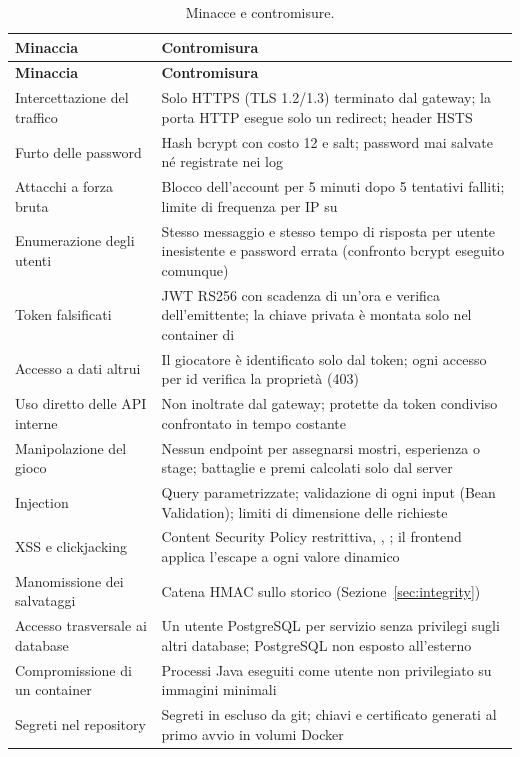 \documentclass[11pt,a4paper]{report}
\begin{document}
\begin{xltabular}{\linewidth}{@{}P{3.6cm}L@{}}
\caption{Minacce e contromisure.}\label{tab:sec}\\
\toprule
\textbf{Minaccia} & \textbf{Contromisura} \\
\midrule
\endfirsthead
\toprule
\textbf{Minaccia} & \textbf{Contromisura} \\
\midrule
\endhead
\bottomrule
\endfoot
Intercettazione del traffico & Solo HTTPS (TLS 1.2/1.3) terminato dal gateway; la porta HTTP esegue solo un redirect; header HSTS \\
Furto delle password & Hash bcrypt con costo 12 e salt; password mai salvate né registrate nei log \\
Attacchi a forza bruta & Blocco dell'account per 5 minuti dopo 5 tentativi falliti; limite di frequenza per IP su  \\
Enumerazione degli utenti & Stesso messaggio e stesso tempo di risposta per utente inesistente e password errata (confronto bcrypt eseguito comunque) \\
Token falsificati & JWT RS256 con scadenza di un'ora e verifica dell'emittente; la chiave privata è montata solo nel container di  \\
Accesso a dati altrui & Il giocatore è identificato solo dal token; ogni accesso per id verifica la proprietà (403) \\
Uso diretto delle API interne & Non inoltrate dal gateway; protette da token condiviso confrontato in tempo costante \\
Manipolazione del gioco & Nessun endpoint per assegnarsi mostri, esperienza o stage; battaglie e premi calcolati solo dal server \\
Injection & Query parametrizzate; validazione di ogni input (Bean Validation); limiti di dimensione delle richieste \\
XSS e clickjacking & Content Security Policy restrittiva, , ; il frontend applica l'escape a ogni valore dinamico \\
Manomissione dei salvataggi & Catena HMAC sullo storico (Sezione~\ref{sec:integrity}) \\
Accesso trasversale ai database & Un utente PostgreSQL per servizio senza privilegi sugli altri database; PostgreSQL non esposto all'esterno \\
Compromissione di un container & Processi Java eseguiti come utente non privilegiato su immagini minimali \\
Segreti nel repository & Segreti in  escluso da git; chiavi e certificato generati al primo avvio in volumi Docker \\
\end{xltabular}
\end{document}
